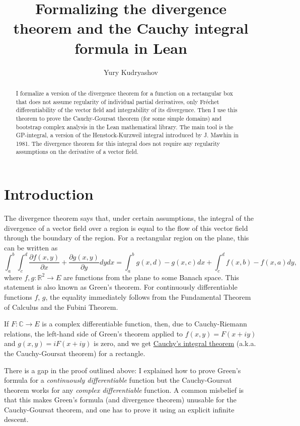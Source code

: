 \documentclass[a4paper, UKenglish,cleveref, autoref, thm-restate]{lipics-v2021}
\author{Yury Kudryashov}{University of Toronto at Mississauga, Canada (till July 2022); Texas A\&M University (since August 2022)}{urkud@urkud.name}{https://orcid.org/0000-0003-4286-9276}{}
\title{Formalizing the divergence theorem and the Cauchy integral formula in Lean}
\newcommand{\bbR}{\mathbb{R}}
\newcommand{\bbC}{\mathbb{C}}
\begin{document}
\sloppy
\maketitle

\begin{abstract}
  I formalize a version of the divergence theorem for a function on a
  rectangular box that does not assume regularity of individual
  partial derivatives, only Fréchet differentiability of the vector
  field and integrability of its divergence. Then I use this theorem
  to prove the Cauchy-Goursat theorem (for some simple domains) and
  bootstrap complex analysis in the Lean mathematical library. The
  main tool is the GP-integral, a version of the Henstock-Kurzweil
  integral introduced by J. Mawhin in 1981. The divergence theorem for
  this integral does not require any regularity assumptions on the
  derivative of a vector field.
\end{abstract}

\section{Introduction}\label{sec:introduction}
The divergence theorem says that, under certain assumptions, the
integral of the divergence of a vector field over a region is equal to
the flow of this vector field through the boundary of the region. For
a rectangular region on the plane, this can be written as
\begin{equation}
  \label{eqn:green-rect}
  \int_{a}^{b}\int_{c}^{d}\frac{\partial f(x, y)}{\partial x}+\frac{\partial g(x, y)}{\partial y}dydx=
  \int_{a}^{b}g(x, d)-g(x, c)dx+\int_{c}^{d}f(x, b)-f(x, a)dy,
\end{equation}
where \(f, g\colon \bbR^{2}\to E\) are functions from the plane to
some Banach space. This statement is also known as Green's theorem.
For continuously differentiable functions \(f\), \(g\), the equality
immediately follows from the Fundamental Theorem of Calculus and the
Fubini Theorem.

If \(F\colon \bbC\to E\) is a complex differentiable function, then, due
to Cauchy-Riemann relations, the left-hand side of Green's theorem
applied to \(f(x, y)=F(x+iy)\) and \(g(x, y)=iF(x+iy)\) is zero, and
we get
\href{https://en.wikipedia.org/wiki/Cauchy's_integral_theorem}{Cauchy's
  integral theorem} (a.k.a. the Cauchy-Goursat theorem) for a rectangle.

There is a gap in the proof outlined above: I explained how to prove
Green's formula for a \emph{continuously differentiable} function
but the Cauchy-Goursat theorem works for any \emph{complex
  differentiable} function. A common misbelief is that this makes
Green's formula (and divergence theorem) unusable for the Cauchy-Goursat
theorem, and one has to prove it using an explicit infinite descent.
\end{document}
